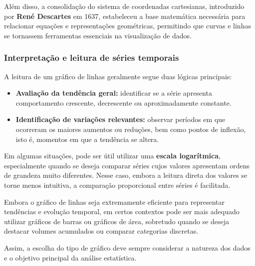 \vskip0.3cm

Além disso, a consolidação do sistema de coordenadas cartesianas, introduzido
por \textbf{René Descartes} em 1637, estabeleceu a base matemática necessária
para relacionar equações e representações geométricas, permitindo que curvas e
linhas se tornassem ferramentas essenciais na visualização de dados.

\vskip0.5cm

\subsubsection{Interpretação e leitura de séries temporais}

A leitura de um gráfico de linhas geralmente segue duas lógicas principais:

\begin{itemize}
    \item \textbf{Avaliação da tendência geral:} identificar se a série apresenta
    comportamento crescente, decrescente ou aproximadamente constante.

    \item \textbf{Identificação de variações relevantes:} observar períodos em que
    ocorreram os maiores aumentos ou reduções, bem como pontos de inflexão,
    isto é, momentos em que a tendência se altera.
\end{itemize}
\vskip0.3cm

Em algumas situações, pode ser útil utilizar uma \textbf{escala logarítmica},
especialmente quando se deseja comparar séries cujos valores apresentam ordens
de grandeza muito diferentes. Nesse caso, embora a leitura direta dos valores
se torne menos intuitiva, a comparação proporcional entre séries é facilitada.
\vskip0.3cm

Embora o gráfico de linhas seja extremamente eficiente para representar
tendências e evolução temporal, em certos contextos pode ser mais adequado
utilizar gráficos de barras ou gráficos de área, sobretudo quando se deseja
destacar volumes acumulados ou comparar categorias discretas.
\vskip0.3cm

Assim, a escolha do tipo de gráfico deve sempre considerar a natureza dos
dados e o objetivo principal da análise estatística.



\newpage


